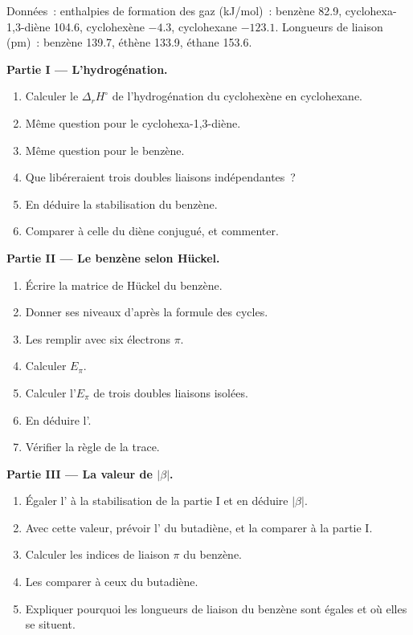 \begin{problem}
\label{pb:b2:huckel:1}
Données~: enthalpies de formation des gaz (\unit{kJ/mol})~: benzène 82.9,
cyclohexa-1,3-diène 104.6, cyclohexène $-4.3$, cyclohexane $-123.1$. Longueurs de liaison
(pm)~: benzène 139.7, éthène 133.9, éthane 153.6.

\medskip
\noindent\textbf{Partie I --- L'hydrogénation.}
\begin{enumerate}
  \item Calculer le $\Delta_r H^\circ$ de l'hydrogénation du cyclohexène en cyclohexane.
  \item Même question pour le cyclohexa-1,3-diène.
  \item Même question pour le benzène.
  \item Que libéreraient trois doubles liaisons indépendantes~?
  \item En déduire la stabilisation du benzène.
  \item Comparer à celle du diène conjugué, et commenter.
\end{enumerate}

\medskip
\noindent\textbf{Partie II --- Le benzène selon Hückel.}
\begin{enumerate}[resume]
  \item Écrire la matrice de Hückel du benzène.
  \item Donner ses niveaux d'après la formule des cycles.
  \item Les remplir avec six électrons $\pi$.
  \item Calculer $E_\pi$.
  \item Calculer l'$E_\pi$ de trois doubles liaisons isolées.
  \item En déduire l'.
  \item Vérifier la règle de la trace.
\end{enumerate}

\medskip
\noindent\textbf{Partie III --- La valeur de $|\beta|$.}
\begin{enumerate}[resume]
  \item Égaler l' à la stabilisation de la partie I et en déduire
        $|\beta|$.
  \item Avec cette valeur, prévoir l' du butadiène, et la comparer
        à la partie I.
  \item Calculer les indices de liaison $\pi$ du benzène.
  \item Les comparer à ceux du butadiène.
  \item Expliquer pourquoi les longueurs de liaison du benzène sont égales et où elles se situent.
\end{enumerate}


\end{problem}
